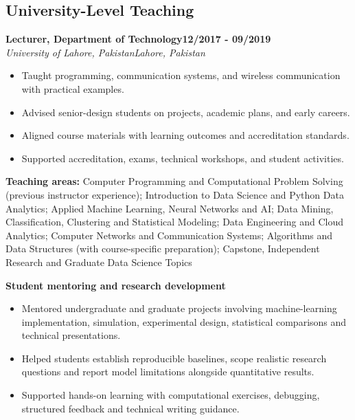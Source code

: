 \documentclass[9pt,letterpaper]{extarticle}
\newcommand{\role}[4]{%
  \Needspace{4\baselineskip}\textbf{#1}\hfill\textbf{#2}\\[-1pt]
  \textit{#3}\hfill\textit{#4}\par}
\begin{document}
\subsection{University-Level Teaching}
\role{Lecturer, Department of Technology}{12/2017 - 09/2019}{University of Lahore, Pakistan}{Lahore, Pakistan}
\begin{itemize}
\item Taught programming, communication systems, and wireless communication with practical examples.
\item Advised senior-design students on projects, academic plans, and early careers.
\item Aligned course materials with learning outcomes and accreditation standards.
\item Supported accreditation, exams, technical workshops, and student activities.
\end{itemize}
\vspace{1pt}
{\small\textbf{Teaching areas:} Computer Programming and Computational Problem Solving (previous instructor experience); Introduction to Data Science and Python Data Analytics; Applied Machine Learning, Neural Networks and AI; Data Mining, Classification, Clustering and Statistical Modeling; Data Engineering and Cloud Analytics; Computer Networks and Communication Systems; Algorithms and Data Structures (with course-specific preparation); Capstone, Independent Research and Graduate Data Science Topics}\par
{}\noindent\textbf{Student mentoring and research development}\par
\begin{itemize}
\item Mentored undergraduate and graduate projects involving machine-learning implementation, simulation, experimental design, statistical comparisons and technical presentations.
\item Helped students establish reproducible baselines, scope realistic research questions and report model limitations alongside quantitative results.
\item Supported hands-on learning with computational exercises, debugging, structured feedback and technical writing guidance.
\end{itemize}
\end{document}
